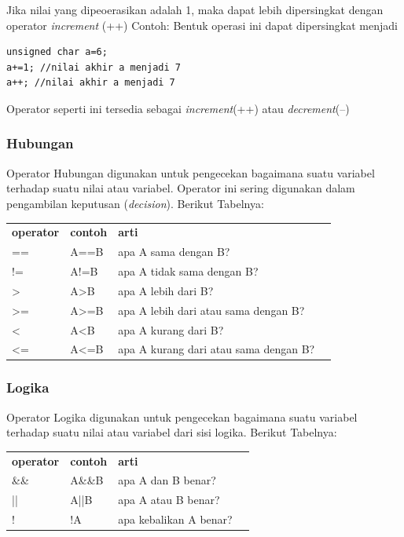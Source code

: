 \documentclass[12pt,]{article}
\begin{document}
	Jika nilai yang dipeoerasikan adalah 1, maka dapat lebih dipersingkat dengan operator \textit{increment} (++)
	Contoh:
	Bentuk operasi ini dapat dipersingkat menjadi
	\begin{verbatim}
unsigned char a=6;
a+=1; //nilai akhir a menjadi 7
a++; //nilai akhir a menjadi 7
	\end{verbatim}
	
	Operator seperti ini tersedia sebagai \textit{increment}(++) atau \textit{decrement}(--)
	
	\subsubsection{Hubungan}
	
	Operator Hubungan digunakan untuk pengecekan bagaimana suatu variabel terhadap suatu nilai atau variabel.
	Operator ini sering digunakan dalam pengambilan keputusan (\textit{decision}).
	Berikut Tabelnya:
	\begin{table}[H]
		\begin{tabular}{|l|l|l|l}
			\cline{1-3}
			\textbf{operator} & \textbf{contoh} & \textbf{arti} \\ \cline{1-3}
			==                & A==B            & apa A sama dengan B? \\ \cline{1-3}
			!=                & A!=B            & apa A tidak sama dengan B? \\ \cline{1-3}
			>                 & A>B             & apa A lebih dari B?  \\ \cline{1-3}
			>=                & A>=B            & apa A lebih dari atau sama dengan B?\\ \cline{1-3}
			<                 & A<B             & apa A kurang dari B? \\ \cline{1-3}
			<=                & A<=B            & apa A kurang dari atau sama dengan B? \\ \cline{1-3}
		\end{tabular}
	\end{table}

	\subsubsection{Logika}
	Operator Logika digunakan untuk pengecekan bagaimana suatu variabel terhadap suatu nilai atau variabel dari sisi logika.
	Berikut Tabelnya:
	\begin{table}[H]
		\begin{tabular}{|l|l|l|l}
			\cline{1-3}
			\textbf{operator} & \textbf{contoh} & \textbf{arti} \\ \cline{1-3}
			\&\&              & A\&\&B          & apa A dan B benar? \\ \cline{1-3}
			||                & A||B            & apa A atau B benar? \\ \cline{1-3}
			!                 & !A              & apa kebalikan A benar?  \\ \cline{1-3}
		\end{tabular}
	\end{table}
	
\end{document}
